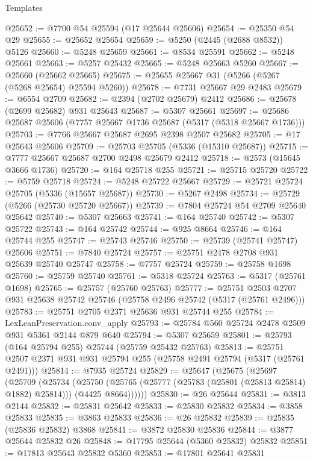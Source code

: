 \begin{lexlean}{Templates}
\begin{coremodule}
@25652 := @7700 @54 @25594 (@17 @25644 @25606)
@25654 := @25350 @54 @29
@25655 := @25652 @25654
@25659 := @5250 (@2445 (@2688 @8532)) @5126
@25660 := @5248 @25659
@25661 := @8534 @25591
@25662 := @5248 @25661
@25663 := @5257 @25432
@25665 := @5248 @25663 @5260
@25667 := @25660 (@25662 @25665)
@25675 := @25655 @25667 @31 (@5266 (@5267 (@5268 @25654) @25594 @5260))
@25678 := @7731 @25667 @29 @2483
@25679 := @6554 @2709
@25682 := @2394 (@2702 @25679) @2412
@25686 := @25678 (@2699 @25682) @931 @25643
@25687 := @5307 @25661
@25697 := @25686 @25687 @25606 (@7757 @25667 @1736 @25687 (@5317 (@5318 @25667 @1736)))
@25703 := @7766 @25667 @25687 @2695 @2398 @2507 @25682
@25705 := @17 @25643 @25606
@25709 := @25703 @25705 (@5336 (@15310 @25687))
@25715 := @7777 @25667 @25687 @2700 @2498 @25679 @2412
@25718 := @2573 (@15645 @3666 @1736)
@25720 := @164 @25718 @255
@25721 := @25715 @25720
@25722 := @5759 @25718
@25724 := @5248 @25722 @25667
@25729 := @25721 @25724 @25705 (@5336 (@15657 @25687))
@25730 := @5267 @2498
@25734 := @25729 (@5266 (@25730 @25720 @25667))
@25739 := @7804 @25724 @54 @2709 @25640 @25642
@25740 := @5307 @25663
@25741 := @164 @25740
@25742 := @5307 @25722
@25743 := @164 @25742
@25744 := @925 @8664
@25746 := @164 @25744 @255
@25747 := @25743 @25746
@25750 := @25739 (@25741 @25747) @25606
@25751 := @7840 @25724
@25757 := @25751 @2478 @2708 @931 @25639 @25740 @25747
@25758 := @7757 @25724
@25759 := @25758 @1698
@25760 := @25759 @25740
@25761 := @5318 @25724
@25763 := @5317 (@25761 @1698)
@25765 := @25757 (@25760 @25763)
@25777 := @25751 @2503 @2707 @931 @25638 @25742 @25746 (@25758 @2496 @25742 (@5317 (@25761 @2496)))
@25783 := @25751 @2705 @2371 @25636 @931 @25744 @255
@25784 := LexLeanPreservation.conv_apply
@25793 := @25784 @560 @25724 @2478 @2509 @931 @5361 @2144 @879 @640
@25794 := @5307 @25659
@25801 := @25793 (@164 @25794 @255) @25744 (@25759 @25432 @25763)
@25813 := @25751 @2507 @2371 @931 @931 @25794 @255 (@25758 @2491 @25794 (@5317 (@25761 @2491)))
@25814 := @7935 @25724
@25829 := @25647
    (@25675
      (@25697
        (@25709
          (@25734
            (@25750
              (@25765 (@25777 (@25783 (@25801 (@25813 @25814) @1882) @25814)))
              (@4425 @8664))))))
@25830 := @26 @25644
@25831 := @3813 @2144
@25832 := @25831 @25642
@25833 := @25830 @25832
@25834 := @3858 @25833
@25835 := @3863 @25833
@25836 := @26 @25832
@25839 := @25835 (@25836 @25832) @3868
@25841 := @3872 @25830 @25836
@25844 := @3877 @25644 @25832 @26
@25848 := @17795 @25644 (@5360 @25832) @25832
@25851 := @17813 @25643 @25832 @5360
@25853 := @17801 @25641 @25831

\end{coremodule}
\end{lexlean}
